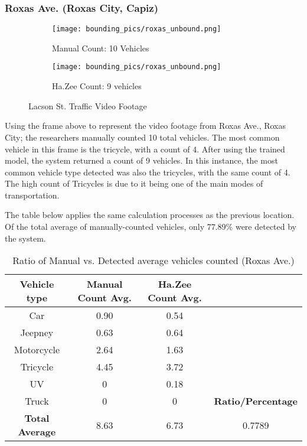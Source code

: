 \subsubsection{Roxas Ave. (Roxas City, Capiz)
}


\begin{figure}
	\begin{subfigure}{.5\textwidth}
		\centering
		\texttt{[image: bounding\_pics/roxas\_unbound.png]}
		\caption{Manual Count: 10 Vehicles}
		
	\end{subfigure}%
	\begin{subfigure}{.5\textwidth}
		\centering
		\texttt{[image: bounding\_pics/roxas\_unbound.png]}
		\caption{Ha.Zee Count: 9 vehicles}
	\end{subfigure}
	\caption{Lacson St. Traffic Video Footage}
\end{figure}
Using the frame above to represent the video footage from  Roxas Ave., Roxas City; the researchers manually counted 10 total vehicles. The most common vehicle in this frame is the tricycle, with a count of 4. After using the trained model, the system returned a count of 9 vehicles. In this instance, the most common vehicle type detected was also the tricycles, with the same count of 4. The high count of Tricycles is due to it being one of the main modes of transportation.

The table below applies the same calculation processes as the previous location. Of the total average of manually-counted vehicles, only 77.89\% were detected by the system. 



\begin{table}[ht]   %
	\centering
	\caption{Ratio of Manual vs. Detected average vehicles counted  (Roxas Ave.)} \vspace{0.25em}
	\begin{tabular}{|c|c|c|c|} \hline
		\centering \textbf {Vehicle type} & Manual Count Avg. & Ha.Zee Count Avg.	&  \\ \hline
		Car & 0.90 & 0.54  &   \\ \hline
		Jeepney & 0.63 & 0.64  &	\\ \hline
		Motorcycle& 2.64  & 1.63  & \\ \hline
		Tricycle   & 4.45  & 3.72 & \\ \hline
		UV & 0 & 0.18 & \\ \hline
		Truck & 0 & 0 & \textbf{Ratio/Percentage}\\ \hline
		
		\textbf{Total Average} & 8.63 & 6.73 & 0.7789 \\ \hline
		
	\end{tabular}
	\label{tab:roxas_ave}
\end{table}

